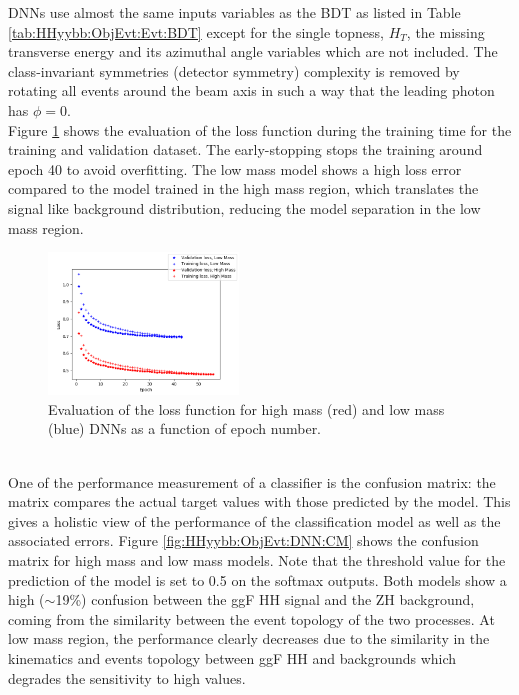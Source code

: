 DNNs use almost the same inputs variables as the BDT as listed in Table \ref{tab:HHyybb:ObjEvt:Evt:BDT} except for the single topness, $H_T$, the missing transverse energy and its azimuthal angle variables which are not included. The class-invariant symmetries (detector symmetry) complexity is removed by rotating all events around the beam axis in such a way that the leading photon has $\phi=0$. \\
Figure \ref{fig:HHyybb:ObjEvt:DNN:Loss} shows the evaluation of the loss function during the training time for the training and validation dataset. The early-stopping stops the training around epoch 40 to avoid overfitting. The low mass model shows a high loss error compared to the model trained in the high mass region, which translates the signal like background distribution, reducing the model separation in the low mass region. \\
\begin{figure}[htbp]
    \centering
    \includegraphics[width=0.45\textwidth]{Ch5/Img/Loss_DNN.png}
    \begin{tcolorbox}[colback=black!5!white,colframe=white!75!black]
    \caption{Evaluation of the loss function for high mass (red) and low mass (blue) DNNs as a function of epoch number.}
    \label{fig:HHyybb:ObjEvt:DNN:Loss}
    \end{tcolorbox}
    
\end{figure}
\\
One of the performance measurement of a classifier is the confusion matrix: the matrix compares the actual target values with those predicted by the model. This gives a holistic view of the performance of the classification model as well as the associated errors. Figure \ref{fig:HHyybb:ObjEvt:DNN:CM} shows the confusion matrix for high mass and low mass models. Note that the threshold value for the prediction of the model is set to 0.5 on the softmax outputs. Both models show a high ($\sim$19\%) confusion between the ggF HH signal and the ZH background, coming from the similarity between the event topology of the two processes. At low mass region, the performance clearly decreases due to the similarity in the kinematics and events topology between ggF HH and backgrounds which degrades the sensitivity to high \kl values.
